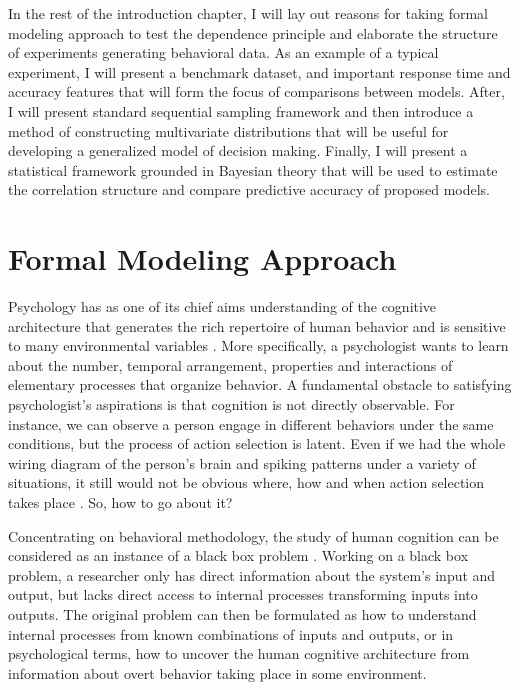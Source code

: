 \documentclass[12pt]{report}
\begin{document}
In the rest of the introduction chapter, I will lay out reasons for taking formal modeling approach to test the dependence principle and elaborate the structure of experiments generating behavioral data. As an example of a typical experiment, I will present a benchmark dataset, and important response time and accuracy features that will form the focus of comparisons between models. After, I will present standard sequential sampling framework and then introduce a method of constructing multivariate distributions that will be useful for developing a generalized model of decision making. Finally, I will present a statistical framework grounded in Bayesian theory that will be used to estimate the correlation structure and compare predictive accuracy of proposed models.

\section{Formal Modeling Approach}

Psychology has as one of its chief aims understanding of the cognitive
architecture that generates the rich repertoire of human behavior and is
sensitive to many environmental variables \citep{AndBot2004,And2007}. More
specifically, a psychologist wants to learn about the number, temporal
arrangement, properties and interactions of elementary
processes that organize behavior. A fundamental obstacle to satisfying psychologist's aspirations is
that cognition is not directly observable. For instance, we can observe a person engage in different behaviors under the same conditions, but the process of action selection is latent. Even if we had the whole wiring diagram of the person's brain and spiking patterns under a variety of situations, it still would not be obvious where, how and when action selection takes place \citep{Bro2014}. So, how to go about it?

Concentrating on behavioral methodology, the study of human cognition can be considered as an instance of a black box
problem \citep{Lju1999, Lju2010}. Working on a black box problem, a
researcher only has direct information about the system's input and
output, but lacks direct access to internal processes transforming inputs
into outputs. The original problem can then be formulated as how to understand internal processes from
known combinations of inputs and outputs, or in psychological terms, how to uncover the human
cognitive architecture from information about overt behavior taking place
in some environment.
\end{document}
